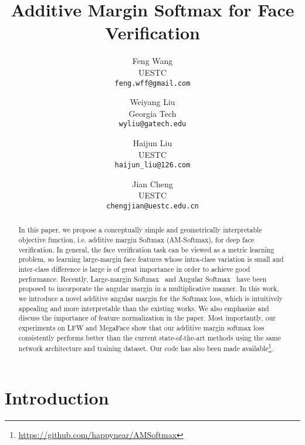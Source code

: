 \documentclass[10pt,twocolumn,letterpaper]{article}
\begin{document}
\title{Additive Margin Softmax for Face Verification}

\author{Feng Wang\\
UESTC\\
{\tt\small feng.wff@gmail.com}
\and
Weiyang Liu\\
Georgia Tech\\
{\tt\small wyliu@gatech.edu}
\and
Haijun Liu\\
UESTC\\
{\tt\small haijun\_liu@126.com}
\and
Jian Cheng\\
UESTC\\
{\tt\small chengjian@uestc.edu.cn}
}

\maketitle


\begin{abstract}
   In this paper, we propose a conceptually simple and geometrically interpretable objective function, i.e. additive margin Softmax (AM-Softmax), for deep face verification. In general, the face verification task can be viewed as a metric learning problem, so learning large-margin face features whose intra-class variation is small and inter-class difference is large is of great importance in order to achieve good performance. Recently, Large-margin Softmax~\cite{liu2016large} and Angular Softmax~\cite{liu2017sphereface} have been proposed to incorporate the angular margin in a multiplicative manner. In this work, we introduce a novel additive angular margin for the Softmax loss, which is intuitively appealing and more interpretable than the existing works. We also emphasize and discuss the importance of feature normalization in the paper. Most importantly, our experiments on LFW and MegaFace show that our additive margin softmax loss consistently performs better than the current state-of-the-art methods using the same network architecture and training dataset. Our code has also been made available\footnote{\url{https://github.com/happynear/AMSoftmax}}.
\end{abstract}

\section{Introduction}
\end{document}
